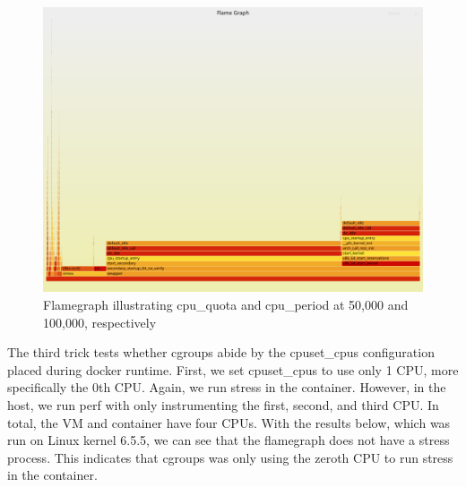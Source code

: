 \documentclass{report}  %
\begin{document}
\begin{figure}[H]
    \centering
    \includegraphics[width=\textwidth]{cpu_tricks/6.5.5/V1/flamegraph_20241017_092923.png}
    \caption{Flamegraph illustrating cpu\_quota and cpu\_period at 50,000 and 100,000, respectively}
    \label{fig:flamegraph}
\end{figure}


\large{
  The third trick tests whether cgroups abide by the cpuset\_cpus configuration placed during docker runtime. First, we set cpuset\_cpus to use only 1 CPU, more specifically the 0th CPU. Again, we run stress in the container. However, in the host, we run perf with only instrumenting the first, second, and third CPU. In total, the VM and container have four CPUs. With the results below, which was run on Linux kernel 6.5.5, we can see that the flamegraph does not have a stress process. This indicates that cgroups was only using the zeroth CPU to run stress in the container. 
}
\end{document}
